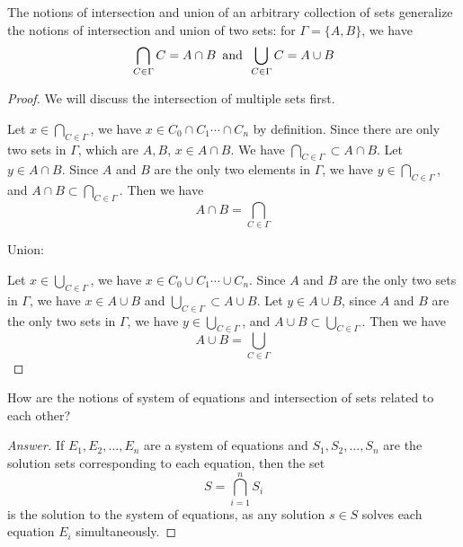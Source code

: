             \begin{majorEx}%
            The notions of intersection and union of an arbitrary collection of sets generalize the notions of intersection and union of two sets: for $\Gamma = \{A, B\}$, we have 
            $$\bigcap_{C \in \Gamma} C = A \cap B \hspace{5pt} \text{\normalfont and} \hspace{5pt} \bigcup_{C \in \Gamma} C = A \cup B$$
            \begin{proof}
            
            We will discuss the intersection of multiple sets first.
            
            Let $x \in \bigcap_{C \in \Gamma}$, we have $x \in C_0 \cap C_1 \cdots \cap C_n$ by definition. Since there are only two sets in $\Gamma$, which are $A, B$, $x \in A \cap B$. We have $\bigcap_{C \in \Gamma} \subset A \cap B$. Let $y \in A \cap B$. Since $A$ and $B$ are the only two elements in $\Gamma$, we have $y \in \bigcap_{C \in \Gamma}$, and $A \cap B \subset \bigcap_{C \in \Gamma}$. Then we have $$A \cap B = \bigcap_{C \in \Gamma}$$
            
            Union:
            
            Let $x \in \bigcup_{C \in \Gamma}$, we have $x \in C_0 \cup C_1 \cdots \cup C_n$. Since $A$ and $B$ are the only two sets in $\Gamma$, we have $x \in A \cup B$ and $\bigcup_{C \in \Gamma} \subset A \cup B$. Let $y \in A \cup B$, since $A$ and $B$ are the only two sets in $\Gamma$, we have $y \in \bigcup_{C \in \Gamma}$, and $A \cup B \subset \bigcup_{C \in \Gamma}$. Then we have $$A \cup B = \bigcup_{C \in \Gamma}$$
            \end{proof}
            
			\end{majorEx}
            
            \begin{minorEx}%
				[Riddle]
                How are the notions of system of equations and intersection of sets related to each other?
			\end{minorEx}
            \begin{proof}
            [Answer]
            If $E_1, E_2, \ldots, E_n$ are a system of equations and $S_1, S_2, \ldots, S_n$ are the solution sets corresponding to each equation, then the set
            \[
            S = \bigcap_{i=1}^{n} S_i
            \]
            is the solution to the system of equations, as any solution $s \in S$ solves each equation $E_i$ simultaneously.
\end{proof}

